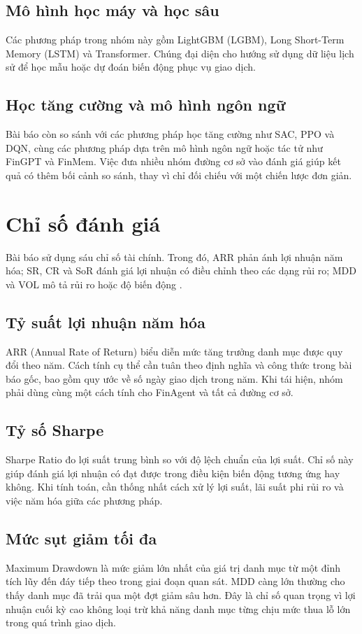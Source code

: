 \subsection{Mô hình học máy và học sâu}
Các phương pháp trong nhóm này gồm LightGBM (LGBM), Long Short-Term Memory (LSTM) và Transformer. Chúng đại diện cho hướng sử dụng dữ liệu lịch sử để học mẫu hoặc dự đoán biến động phục vụ giao dịch.

\subsection{Học tăng cường và mô hình ngôn ngữ}
Bài báo còn so sánh với các phương pháp học tăng cường như SAC, PPO và DQN, cùng các phương pháp dựa trên mô hình ngôn ngữ hoặc tác tử như FinGPT và FinMem. Việc đưa nhiều nhóm đường cơ sở vào đánh giá giúp kết quả có thêm bối cảnh so sánh, thay vì chỉ đối chiếu với một chiến lược đơn giản.

\section{Chỉ số đánh giá}

Bài báo sử dụng sáu chỉ số tài chính. Trong đó, ARR phản ánh lợi nhuận năm hóa; SR, CR và SoR đánh giá lợi nhuận có điều chỉnh theo các dạng rủi ro; MDD và VOL mô tả rủi ro hoặc độ biến động \cite{zhang2024finagent}.

\subsection{Tỷ suất lợi nhuận năm hóa}
ARR (Annual Rate of Return) biểu diễn mức tăng trưởng danh mục được quy đổi theo năm. Cách tính cụ thể cần tuân theo định nghĩa và công thức trong bài báo gốc, bao gồm quy ước về số ngày giao dịch trong năm. Khi tái hiện, nhóm phải dùng cùng một cách tính cho FinAgent và tất cả đường cơ sở.

\subsection{Tỷ số Sharpe}
Sharpe Ratio đo lợi suất trung bình so với độ lệch chuẩn của lợi suất. Chỉ số này giúp đánh giá lợi nhuận có đạt được trong điều kiện biến động tương ứng hay không. Khi tính toán, cần thống nhất cách xử lý lợi suất, lãi suất phi rủi ro và việc năm hóa giữa các phương pháp.

\subsection{Mức sụt giảm tối đa}
Maximum Drawdown là mức giảm lớn nhất của giá trị danh mục từ một đỉnh tích lũy đến đáy tiếp theo trong giai đoạn quan sát. MDD càng lớn thường cho thấy danh mục đã trải qua một đợt giảm sâu hơn. Đây là chỉ số quan trọng vì lợi nhuận cuối kỳ cao không loại trừ khả năng danh mục từng chịu mức thua lỗ lớn trong quá trình giao dịch.

